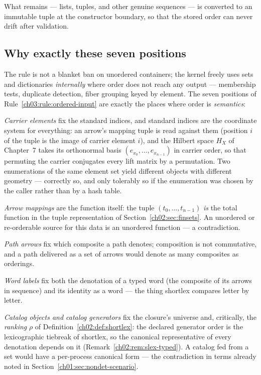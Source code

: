 What remains --- lists, tuples, and other genuine sequences --- is
converted to an immutable tuple at the constructor boundary, so that the
stored order can never drift after validation.

\subsection{Why exactly these seven positions}

The rule is not a blanket ban on unordered containers; the kernel freely
uses sets and dictionaries \emph{internally} where order does not reach any
output --- membership tests, duplicate detection, fiber grouping keyed by
element. The seven positions of Rule~\ref{ch03:rule:ordered-input} are
exactly the places where order is \emph{semantics}:

\emph{Carrier elements} fix the standard indices, and standard indices are
the coordinate system for everything: an arrow's mapping tuple is read
against them (position $i$ of the tuple is the image of carrier element
$i$), and the Hilbert space $H_X$ of Chapter~7 takes its orthonormal basis
$(e_{x_0}, \dots, e_{x_{n-1}})$ in carrier order, so that permuting the
carrier conjugates every lift matrix by a permutation. Two enumerations of
the same element set yield different objects with different geometry ---
correctly so, and only tolerably so if the enumeration was chosen by the
caller rather than by a hash table.

\emph{Arrow mappings} are the function itself: the tuple
$(t_0, \dots, t_{n-1})$ \emph{is} the total function in the tuple
representation of Section~\ref{ch02:sec:finsets}. An unordered or
re-orderable source for this data is an unordered function --- a
contradiction.

\emph{Path arrows} fix which composite a path denotes; composition is not
commutative, and a path delivered as a set of arrows would denote as many
composites as orderings.

\emph{Word labels} fix both the denotation of a typed word (the composite
of its arrows in sequence) and its identity as a word --- the thing
shortlex compares letter by letter.

\emph{Catalog objects and catalog generators} fix the closure's universe
and, critically, the \emph{ranking} $\rho$ of
Definition~\ref{ch02:def:shortlex}: the declared generator order is the
lexicographic tiebreak of shortlex, so the canonical representative of
every denotation depends on it
(Remark~\ref{ch02:rem:slex-typed}). A catalog fed from a set would have a
per-process canonical form --- the contradiction in terms already noted in
Section~\ref{ch01:sec:nondet-scenario}.

